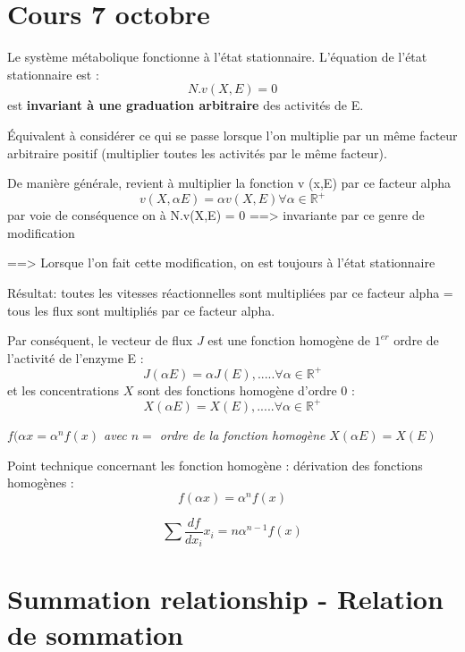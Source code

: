 \renewcommand{\labelitemi}{$\bullet$}
\renewcommand{\labelitemii}{$\cdot$}
\renewcommand{\labelitemiii}{$\diamond$}
\renewcommand{\labelitemiv}{$\ast$}

\section{Cours 7 octobre}

Le système métabolique fonctionne à l'état stationnaire. L'équation de l'état stationnaire est : $$N.v(X,E) = 0$$ est \textbf{invariant à une graduation arbitraire} des activités de E.

Équivalent à considérer ce qui se passe lorsque l'on multiplie par un même facteur arbitraire positif (multiplier toutes les activités par le même facteur).

De manière générale, revient à multiplier la fonction v (x,E) par ce facteur alpha
$$ v(X,\alpha E) = \alpha v(X,E)  \forall \alpha \in \mathbb{R}^+ $$
par voie de conséquence on à N.v(X,E) = 0
==> invariante par ce genre de modification

==> Lorsque l'on fait cette modification, on est toujours à l'état stationnaire

Résultat: toutes les vitesses réactionnelles sont multipliées par ce facteur alpha = tous les flux sont multipliés par ce facteur alpha.

Par conséquent, le vecteur de flux $J$ est une fonction homogène de $1^{er}$ ordre de l'activité de l'enzyme E : 
$$J(\alpha E) = \alpha J(E), \text{.....}  \forall \alpha \in \mathbb{R}^+ $$
et les concentrations $X$ sont des fonctions homogène d'ordre 0 :
$$ X(\alpha E) = X(E), \text{.....}  \forall \alpha \in \mathbb{R}^+ $$
 
 
 
 

\textit{$f(\alpha x = \alpha ^n f(x)$  avec $n=$ ordre de la fonction homogène }
$X(\alpha E) = X(E)$

Point technique concernant les fonction homogène : dérivation des fonctions homogènes :
$$f(\alpha x) = \alpha ^n f(x)$$

$$	\sum \frac{df}{dx_i} x_i = n \alpha ^{n-1} f(x)$$





\section{Summation relationship - Relation de sommation}

